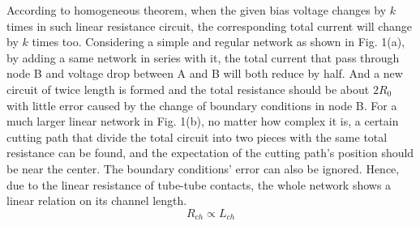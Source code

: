 \documentclass[letterpaper, 10 pt, conference]{ieeeconf}
\begin{document}
According to homogeneous theorem, when the given bias voltage changes by $k$ times in such linear resistance circuit, the corresponding total current will change by $k$ times too. Considering a simple and regular network as shown in Fig. 1(a), by adding a same network in series with it, the total current that pass through node B and voltage drop between A and B will both reduce by half. And a new circuit of twice length is formed and the total resistance should be about $2R_0$ with little error caused by the change of boundary conditions in node B. For a much larger linear network in Fig. 1(b), no matter how complex it is, a certain cutting path that divide the total circuit into two pieces with the same total resistance can be found, and the expectation of the cutting path's position should be near the center. The boundary conditions' error can also be ignored. Hence, due to the linear resistance of tube-tube contacts, the whole network shows a linear relation on its channel length.
\begin{equation}
  R_{ch}\propto L_{ch}
\end{equation}
\end{document}
